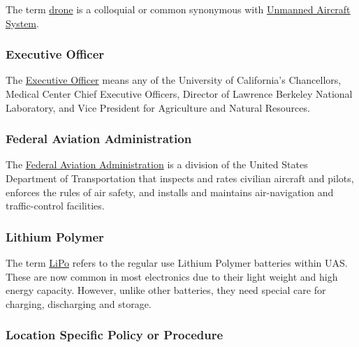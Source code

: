 \documentclass[
]{book}
\begin{document}
The term \protect\hyperlink{drone}{drone} is a colloquial or common synonymous with \protect\hyperlink{UAS}{Unmanned Aircraft System}.



\hypertarget{EO}{%
\subsubsection*{Executive Officer}\label{EO}}

The \protect\hyperlink{EO}{Executive Officer} means any of the University of California's Chancellors, Medical Center Chief Executive Officers, Director of Lawrence Berkeley National Laboratory, and Vice President for Agriculture and Natural Resources.



\hypertarget{FAA}{%
\subsubsection*{Federal Aviation Administration}\label{FAA}}

The \protect\hyperlink{FAA}{Federal Aviation Administration} is a division of the United States Department of Transportation that inspects and rates civilian aircraft and pilots, enforces the rules of air safety, and installs and maintains air-navigation and traffic-control facilities.





\hypertarget{LiPo}{%
\subsubsection*{Lithium Polymer}\label{LiPo}}

The term \protect\hyperlink{LiPo}{LiPo} refers to the regular use Lithium Polymer batteries within UAS. These are now common in most electronics due to their light weight and high energy capacity. However, unlike other batteries, they need special care for charging, discharging and storage.



\hypertarget{LSP}{%
\subsubsection*{Location Specific Policy or Procedure}\label{LSP}}
\end{document}

